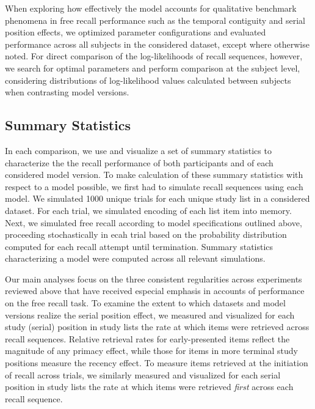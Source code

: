 \documentclass[
  letterpaper,
]{article}
\begin{document}
When exploring how effectively the model accounts for qualitative
benchmark phenomena in free recall performance such as the temporal
contiguity and serial position effects, we optimized parameter
configurations and evaluated performance across all subjects in the
considered dataset, except where otherwise noted. For direct comparison
of the log-likelihoods of recall sequences, however, we search for
optimal parameters and perform comparison at the subject level,
considering distributions of log-likelihood values calculated between
subjects when contrasting model versions.

\hypertarget{summary-statistics}{%
\subsection{Summary Statistics}\label{summary-statistics}}

In each comparison, we use and visualize a set of summary statistics to
characterize the the recall performance of both participants and of each
considered model version. To make calculation of these summary
statistics with respect to a model possible, we first had to simulate
recall sequences using each model. We simulated 1000 unique trials for
each unique study list in a considered dataset. For each trial, we
simulated encoding of each list item into memory. Next, we simulated
free recall according to model specifications outlined above, proceeding
stochastically in ecah trial based on the probability distribution
computed for each recall attempt until termination. Summary statistics
characterizing a model were computed across all relevant simulations.

Our main analyses focus on the three consistent regularities across
experiments reviewed above that have received especial emphasis in
accounts of performance on the free recall task. To examine the extent
to which datasets and model versions realize the serial position effect,
we measured and visualized for each study (serial) position in study
lists the rate at which items were retrieved across recall sequences.
Relative retrieval rates for early-presented items reflect the magnitude
of any primacy effect, while those for items in more terminal study
positions measure the recency effect. To measure items retrieved at the
initiation of recall across trials, we similarly measured and visualized
for each serial position in study lists the rate at which items were
retrieved \emph{first} across each recall sequence.
\end{document}

